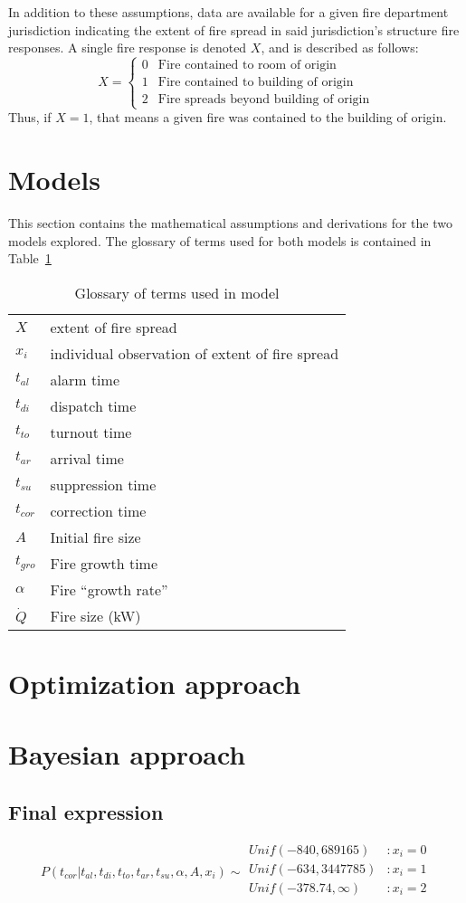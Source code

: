 \documentclass[letterpaper,11pt]{article}
\begin{document}
In addition to these assumptions, data are available for a given fire department jurisdiction indicating the extent of fire spread in said jurisdiction's structure fire responses. A single fire response is denoted $X$, and is described as follows:
\[X = \left\{
      \begin{array}{ll}
	0 & \text{Fire contained to room of origin} \\
	1 & \text{Fire contained to building of origin} \\
	2 & \text{Fire spreads beyond building of origin}
      \end{array}
      \right.
\]
Thus, if $X=1$, that means a given fire was contained to the building of origin.

\section{Models}
This section contains the mathematical assumptions and derivations for the two models explored. The glossary of terms used for both models is contained in Table~\ref{tab:terminology}
\begin{table}
  \centering
  \begin{tabular}{lp{4cm}}
    $X$ & extent of fire spread \\
    $x_i$ & individual observation of extent of fire spread \\
    $t_{al}$ & alarm time \\
    $t_{di}$ & dispatch time \\
    $t_{to}$ & turnout time \\
    $t_{ar}$ & arrival time \\
    $t_{su}$ & suppression time \\
    $t_{cor}$ & correction time \\
    $A$ & Initial fire size \\
    $t_{gro}$ & Fire growth time \\
    $\alpha$ & Fire ``growth rate'' \\
    $\dot{Q}$ & Fire size (kW) \\
  \end{tabular}
  \caption{Glossary of terms used in model}
  \label{tab:terminology}
\end{table}
\section{Optimization approach}
\section{Bayesian approach}
\subsection{Final expression}

\[P(t_{cor} | t_{al},t_{di},t_{to},t_{ar},t_{su},\alpha,A,x_i) \sim
  \begin{array}{lr}
    Unif(-840,689165) & : x_i = 0 \\
    Unif(-634,3447785) & : x_i = 1 \\
    Unif(-378.74,\infty) & : x_i = 2 \\
  \end{array}
\]
\end{document}
